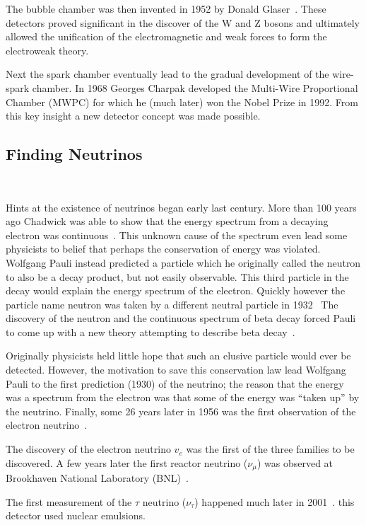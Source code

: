 The bubble chamber was then invented in 1952 by Donald Glaser~\citep{bubbleChamber_PhysRev.87.665}.
These detectors proved significant in the discover of the W and Z bosons and ultimately allowed the unification of the electromagnetic and weak forces to form the electroweak theory.

Next the spark chamber eventually lead to the gradual development of the wire-spark chamber.
In 1968 Georges Charpak developed the Multi-Wire Proportional Chamber (MWPC) for which he (much later) won the Nobel Prize in 1992.
From this key insight a new detector concept was made possible.

\subsection{Finding Neutrinos}
~\label{sec:neutrinos}

Hints at the existence of neutrinos began early last century.
More than 100 years ago Chadwick was able to show that the energy spectrum from a decaying electron was continuous~\citep{Chadwick:1914zz}.
This unknown cause of the spectrum even lead some physicists to belief that perhaps the conservation of energy was violated.
Wolfgang Pauli instead predicted a particle which he originally called the neutron to also be a decay product, but not easily observable.
This third particle in the decay would explain the energy spectrum of the electron.
Quickly however the particle name neutron was taken by a different neutral particle in 1932~\citep{Chadwick1932PossibleEO}
The discovery of the neutron and the continuous spectrum of beta decay forced Pauli to come up with a new theory attempting to describe beta decay~\citep{pauli_1934}.

Originally physicists held little hope that such an elusive particle would ever be detected.
However, the motivation to save this conservation law lead Wolfgang Pauli to the first prediction (1930) of the neutrino; the reason that the energy was a spectrum from the electron was that some of the energy was ``taken up'' by the neutrino.
Finally, some 26 years later in 1956 was the first observation of the electron neutrino~\citep{first_neutrino_measurement}.

The discovery of the electron neutrino $v_{e}$ was the first of the three families to be discovered.
A few years later the first reactor neutrino ($\nu_{\mu}$) was observed at Brookhaven National Laboratory (BNL)~\citep{PhysRevLett.9.36}.

The first measurement of the $\tau$ neutrino ($\nu_{\tau}$) happened much later in 2001~\citep{tau_neutrino_discovery_KODAMA2001218}.
this detector used nuclear emulsions.

